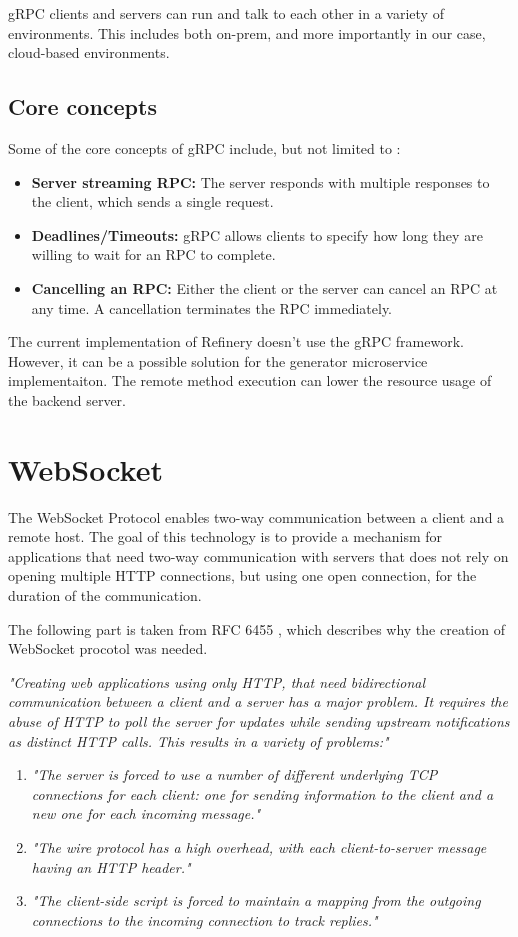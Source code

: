 	gRPC clients and servers can run and talk to each other in a variety of environments. This includes both on-prem, and more importantly in our case,
	cloud-based environments.

	\subsection{Core concepts}
	Some of the core concepts of gRPC include, but not limited to \cite{grpcspec2}:
	\begin{itemize}
		\item \textbf{Server streaming RPC:} The server responds with multiple responses to the client, which sends a single request. 
		\item \textbf{Deadlines/Timeouts:} gRPC allows clients to specify how long they are willing to wait for an RPC to complete. 
		\item \textbf{Cancelling an RPC:} Either the client or the server can cancel an RPC at any time. 
		A cancellation terminates the RPC immediately.
	\end{itemize}

	The current implementation of Refinery doesn't use the gRPC framework. However, it can be a possible solution for the generator microservice implementaiton. 
	The remote method execution can lower the resource usage of the backend server.

\section{WebSocket} \label{backgrwebsocket}
	The WebSocket Protocol \cite{websocket} enables two-way communication between a client
	and a remote host.
	The goal of
	this technology is to provide a mechanism for applications that need two-way communication with servers that does
	not rely on opening multiple HTTP connections, but using one open connection, for the duration of the communication.

	The following part is taken from RFC 6455 \cite{websocket}, which describes why the creation of WebSocket procotol was needed.

	\textit{
		"Creating web applications using only HTTP, that need bidirectional
		communication between a client and a server has a major problem. 
		It requires the abuse of HTTP to poll the
		server for updates while sending upstream notifications as distinct
		HTTP calls.
		This results in a variety of problems:"
	}
	\begin{enumerate}
		\item \textit{"The server is forced to use a number of different underlying TCP
		connections for each client: one for sending information to the
		client and a new one for each incoming message."}
		\item \textit{"The wire protocol has a high overhead, with each client-to-server
		message having an HTTP header."}
		\item \textit{"The client-side script is forced to maintain a mapping from the
		outgoing connections to the incoming connection to track replies."}
	\end{enumerate}

